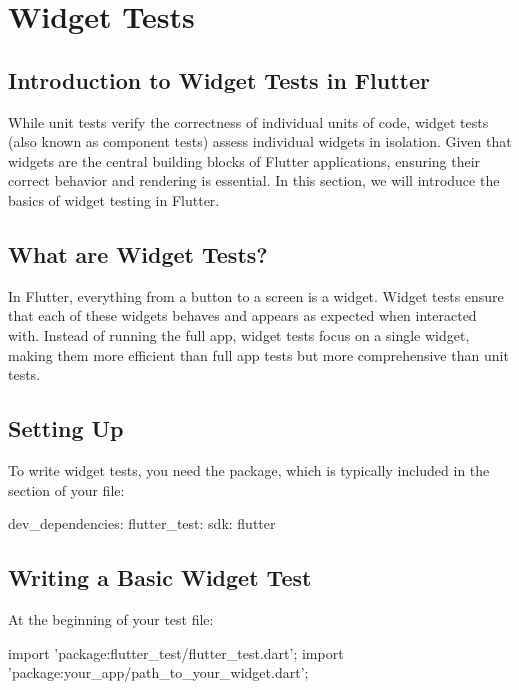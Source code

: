 \section{Widget Tests}

\subsection{Introduction to Widget Tests in Flutter}
While unit tests verify the correctness of individual units of code, widget tests (also known as component tests) assess individual widgets in isolation. 
Given that widgets are the central building blocks of Flutter applications, ensuring their correct behavior and rendering is essential. 
In this section, we will introduce the basics of widget testing in Flutter.

\subsection*{What are Widget Tests?}

In Flutter, everything from a button to a screen is a widget. 
Widget tests ensure that each of these widgets behaves and appears as expected when interacted with. 
Instead of running the full app, widget tests focus on a single widget, making them more efficient than full app tests but more comprehensive than unit tests.

\subsection*{Setting Up}

To write widget tests, you need the  package, which is typically included in the  section of your  file:

\begin{yamlcode}
dev_dependencies:
  flutter_test:
    sdk: flutter
\end{yamlcode}

\subsection*{Writing a Basic Widget Test}
At the beginning of your test file:
\begin{dartcode}
import 'package:flutter_test/flutter_test.dart';
import 'package:your_app/path_to_your_widget.dart';
\end{dartcode}

